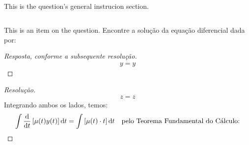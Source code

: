\documentclass[12pt, a4paper]{article}
\newenvironment{answer}
  {\renewcommand\qedsymbol{$\blacksquare$}\begin{proof}[Resposta, conforme a subsequente resolução]}
  {\end{proof}}
\newenvironment{resolution}
  {\renewcommand\qedsymbol{$\blacksquare$}\begin{proof}[Resolução]}
  {\end{proof}}
\begin{document}
\newcommand{\EXEMPLOITEMa}
{Encontre a solução da equação diferencial dada por:
}
% 
\section{} %
This is the question's general instrucion section.

\subsection{} %
This is an item on the question. \EXEMPLOITEMa

\begin{answer}
  \begin{align*}
    y=y
  \end{align*}
\end{answer}

\begin{resolution}
  \begin{align}
    z=z
    \label{q2}
  \end{align}
  Integrando ambos os lados, temos:
  \begin{align*}
    \int{ \dv{}{t} \left[\mu(t)y(t)\right] \dd{t} } & = \int{ [\mu(t) \cdot t] \dd{t} }
                                                    &                                   & \text{pelo Teorema Fundamental do Cálculo:} \\
  \end{align*}
\end{resolution}


\end{document}
